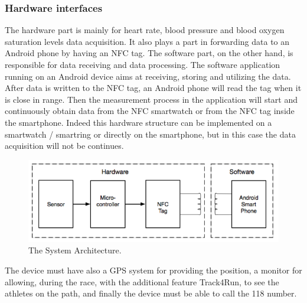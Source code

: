 \subsubsection{Hardware interfaces}
The hardware part is mainly for heart rate, blood pressure and blood oxygen saturation levels data acquisition. It also plays a part in forwarding data to an Android phone by having an NFC tag. The software part, on the other hand, is responsible for data receiving and data processing. The software application running on an Android device aims at receiving, storing and utilizing the data. After data is written to the NFC tag, an Android phone will read the tag when it is close in range. Then the measurement process in the application will start and continuously obtain data from the NFC smartwatch or from the NFC tag inside the smartphone. Indeed this hardware structure can be implemented on a smartwatch / smartring or directly on the smartphone, but in this case the data acquisition will not be continues.
\begin{figure}[h!]
  \includegraphics[width=\linewidth]{Images/hardware}
  \caption{The System Architecture.}
  \label{fig:The System Architecture}
\end{figure} 
The device must have also a GPS system for providing the position, a monitor for allowing, during the race, with the additional feature Track4Run, to see the athletes on the path, and finally the device must be able to call the 118 number.

